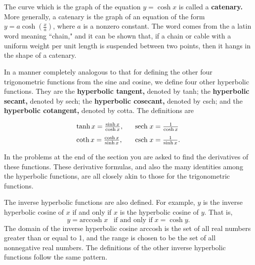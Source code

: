 The curve which is the graph of the equation $y = \cosh x$ is called a \textbf{catenary.} More generally, a catenary is the graph of an equation of the form $y = a \cosh (\frac{x}{a})$, where $a$ is a nonzero constant. The word comes from the a latin word meaning ``chain," and it can be shown that, if a chain or cable with a uniform weight per unit length is suspended between two points, then it hangs in the shape of a catenary.

In a manner completely analogous to that for defining the other four trigonometric functions from the sine and cosine, we define four other hyperbolic functions. They are the \textbf{hyperbolic tangent,} denoted by tanh; the \textbf{hyperbolic secant,} denoted by sech; the \textbf{hyperbolic cosecant,} denoted by csch; and the \textbf{hyperbolic cotangent,} denoted by cotta. The definitions are

\begin{equation}
\begin{array}{ll}
\tanh x = \frac{\sinh x}{\cosh x},  \;\;\; &   \mbox{sech}\; x = \frac{1}{\cosh x} \vspace{.1in}  \\
\coth x = \frac{\cosh x}{\sinh x},  \;\;\; &   \mbox{csch}\; x = \frac{1}{\sinh x} . 
\end{array}
\label{eq11.6.5}
\end{equation}

\noindent In the problems at the end of the section you are asked to find the derivatives of these functions. These derivative formulas, and also the many identities among the hyperbolic functions, are all closely akin to those for the trigonometric functions.

The inverse hyperbolic functions are also defined. For example, $y$ is the inverse hyperbolic cosine of $x$ if and only if $x$ is the hyperbolic cosine of $y$. That is,
$$
y = \mbox{arccosh}\; x \;\;\;\mbox{if and only if}\; x = \cosh y.  
$$
The domain of the inverse hyperbolic cosine arccosh is the set of all real numbers greater than or equal to 1, and the range is chosen to be the set of all nonnegative real numbers. The definitions of the other inverse hyperbolic functions follow the same pattern.
